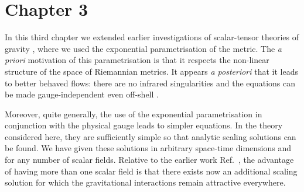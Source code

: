 \documentclass[11pt]{book}
\newcommand{\hk}{\hat k}
\numberwithin{equation}{chapter}
\begin{document}



\section*{Chapter 3}

In this third chapter we extended earlier investigations of scalar-tensor
theories of gravity \cite{Percacci:2015wwa},
where we used the exponential parametrisation of the metric.
The {\it a priori} motivation of this parametrisation is that
it respects the non-linear structure of the space of Riemannian metrics.
It appears {\it a posteriori} that it leads to better behaved flows:
there are no infrared singularities \cite{Percacci:2015wwa,Falls:2015qga}
and the equations can be made gauge-independent even off-shell
\cite{Falls:2015qga}.

Moreover, quite generally, the use of the exponential parametrisation
in conjunction with the physical gauge leads to simpler equations.
In the theory considered here, they are sufficiently simple
so that analytic scaling solutions can be found.
We have given these solutions in arbitrary
space-time dimensions and for any number of scalar fields.
Relative to the earlier work Ref.~\cite{Percacci:2015wwa},
the advantage of having more than
one scalar field is that there exists now an additional
scaling solution for which the gravitational interactions
remain attractive everywhere.
\end{document}
